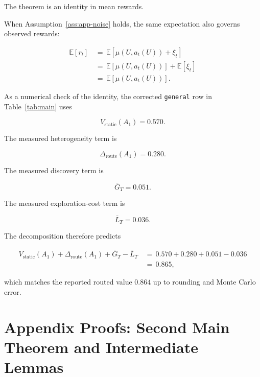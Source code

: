 \documentclass{article} %
\begin{document}
The theorem is an identity in mean rewards.

When Assumption~\ref{ass:app-noise} holds, the same expectation also governs observed rewards:

\begin{align}
\label{eq:app-observed-mean-link}
\mathbb{E}[r_t]
&\,=\,
\mathbb{E}[\mu(U,a_t(U))+\xi_t]
\\
&\,=\,
\mathbb{E}[\mu(U,a_t(U))]
+
\mathbb{E}[\xi_t]
\\
&\,=\,
\mathbb{E}[\mu(U,a_t(U))].
\end{align}

As a numerical check of the identity, the corrected \texttt{general} row in Table~\ref{tab:main} uses

\begin{equation}
\label{eq:app-numeric-static}
V_{\mathrm{static}}(A_1)=0.570.
\end{equation}

The measured heterogeneity term is

\begin{equation}
\label{eq:app-numeric-het}
\Delta_{\mathrm{route}}(A_1)=0.280.
\end{equation}

The measured discovery term is

\begin{equation}
\label{eq:app-numeric-discovery}
\bar G_T=0.051.
\end{equation}

The measured exploration-cost term is

\begin{equation}
\label{eq:app-numeric-tax}
\bar L_T=0.036.
\end{equation}

The decomposition therefore predicts

\begin{align}
\label{eq:app-numeric-closure}
V_{\mathrm{static}}(A_1)
+
\Delta_{\mathrm{route}}(A_1)
+
\bar G_T
-
\bar L_T
&\,=\,
0.570+0.280+0.051-0.036
\\
&\,=\,
0.865,
\end{align}

which matches the reported routed value \(0.864\) up to rounding and Monte Carlo error.

\section{Appendix Proofs: Second Main Theorem and Intermediate Lemmas}
\end{document}
